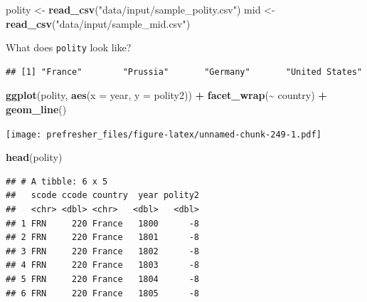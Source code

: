 \documentclass[
]{book}
\newenvironment{Shaded}{\begin{snugshade}}{\end{snugshade}}
\newcommand{\DataTypeTok}[1]{\textcolor[rgb]{0.13,0.29,0.53}{#1}}
\newcommand{\KeywordTok}[1]{\textcolor[rgb]{0.13,0.29,0.53}{\textbf{#1}}}
\newcommand{\NormalTok}[1]{#1}
\newcommand{\OperatorTok}[1]{\textcolor[rgb]{0.81,0.36,0.00}{\textbf{#1}}}
\newcommand{\StringTok}[1]{\textcolor[rgb]{0.31,0.60,0.02}{#1}}
\theoremstyle{definition}
\theoremstyle{definition}
\theoremstyle{definition}
\theoremstyle{remark}
\begin{document}
\begin{Shaded}
\begin{Highlighting}[]
\NormalTok{polity <{-}}\StringTok{ }\KeywordTok{read\_csv}\NormalTok{(}\StringTok{"data/input/sample\_polity.csv"}\NormalTok{)}
\NormalTok{mid <{-}}\StringTok{ }\KeywordTok{read\_csv}\NormalTok{(}\StringTok{"data/input/sample\_mid.csv"}\NormalTok{)}
\end{Highlighting}
\end{Shaded}

What does \texttt{polity} look like?

\begin{Shaded}
\end{Shaded}

\begin{verbatim}
## [1] "France"        "Prussia"       "Germany"       "United States"
\end{verbatim}

\begin{Shaded}
\begin{Highlighting}[]
\KeywordTok{ggplot}\NormalTok{(polity, }\KeywordTok{aes}\NormalTok{(}\DataTypeTok{x =}\NormalTok{ year, }\DataTypeTok{y =}\NormalTok{ polity2)) }\OperatorTok{+}
\StringTok{  }\KeywordTok{facet\_wrap}\NormalTok{(}\OperatorTok{\textasciitilde{}}\StringTok{ }\NormalTok{country) }\OperatorTok{+}
\StringTok{  }\KeywordTok{geom\_line}\NormalTok{()}
\end{Highlighting}
\end{Shaded}

\texttt{[image: prefresher\_files/figure-latex/unnamed-chunk-249-1.pdf]}

\begin{Shaded}
\begin{Highlighting}[]
\KeywordTok{head}\NormalTok{(polity)}
\end{Highlighting}
\end{Shaded}

\begin{verbatim}
## # A tibble: 6 x 5
##   scode ccode country  year polity2
##   <chr> <dbl> <chr>   <dbl>   <dbl>
## 1 FRN     220 France   1800      -8
## 2 FRN     220 France   1801      -8
## 3 FRN     220 France   1802      -8
## 4 FRN     220 France   1803      -8
## 5 FRN     220 France   1804      -8
## 6 FRN     220 France   1805      -8
\end{verbatim}
\end{document}
